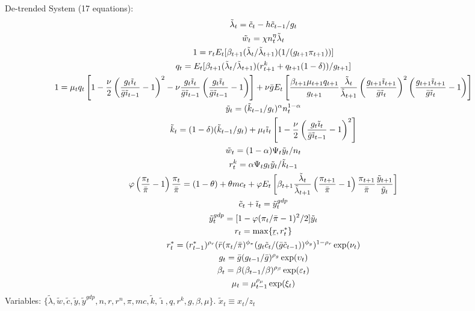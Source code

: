 \documentclass[12pt, final]{article}
\newcommand{\ubar}[1]{\underaccent{\bar}{#1}}
\begin{document}
\noindent De-trended System (17 equations):
\scriptsize\begin{gather}
  \tilde{\lambda}_t = \tilde{c}_t-h\tilde{c}_{t-1}/g_t\\
  \tilde{w}_t=\chi n_t^\eta\tilde{\lambda}_t \\
  1= r_tE_t[\beta_{t+1}(\tilde{\lambda}_t/\tilde{\lambda}_{t+1})(1/(g_{t+1}\pi_{t+1}))]\\
  q_t = E_t[\beta_{t+1}(\tilde{\lambda}_t/\tilde{\lambda}_{t+1})(r_{t+1}^k+q_{t+1}(1-\delta))/g_{t+1}]\\
  1 = \mu_tq_t\left[1-\frac{\nu}{2}\left(\frac{g_t\tilde{\imath}_t}{\bar{g}\tilde{\imath}_{t-1}}-1\right)^2-\nu\frac{g_t\tilde{\imath}_t}{\bar{g}\tilde{\imath}_{t-1}} \left(\frac{g_t\tilde{\imath}_t}{\bar{g}\tilde{\imath}_{t-1}}-1\right)\right]+\nu\bar{g}
  E_t\left[\frac{\beta_{t+1}\mu_{t+1}q_{t+1}}{g_{t+1}}\frac{\tilde{\lambda}_t}{\tilde{\lambda}_{t+1}}\left(\frac{g_{t+1}\tilde{\imath}_{t+1}}{\bar{g}\tilde{\imath}_t}\right)^2\left(\frac{g_{t+1}\tilde{\imath}_{t+1}}{\bar{g}\tilde{\imath}_t}-1\right)\right]\\
  \tilde{y}_t=(\tilde{k}_{t-1}/g_t)^\alpha n_t^{1-\alpha}\\
  \tilde{k}_t=(1-\delta)(\tilde{k}_{t-1}/g_t)+\mu_t\tilde{\imath}_t\left[1-\frac{\nu}{2}\left(\frac{g_t\tilde{\imath}_t}{\bar{g}\tilde{\imath}_{t-1}}-1\right)^2\right]\\
  \tilde{w}_t = (1-\alpha)\Psi_t\tilde{y}_t/n_t\\
  r_t^k = \alpha\Psi_tg_t\tilde{y}_t/\tilde{k}_{t-1}\\  
  \varphi\left(\frac{\pi_t}{\bar{\pi}}-1\right)\frac{\pi_t}{\bar{\pi}} = (1-\theta) + \theta mc_t + \varphi E_t\left[\beta_{t+1}\frac{\tilde{\lambda}_t}{\tilde{\lambda}_{t+1}}\left(\frac{\pi_{t+1}}{\bar{\pi}}-1\right)\frac{\pi_{t+1}}{\bar{\pi}}\frac{\tilde{y}_{t+1}}{\tilde{y}_t}\right]\\ \tilde{c}_t+\tilde{\imath}_t=\tilde{y}_t^{gdp}\\  
  \tilde{y}_t^{gdp}=[1-\varphi(\pi_t/\bar{\pi}-1)^2/2]\tilde{y}_t\\
   r_t=\max\{\ubar{r},r_t^*\}\\
   r_t^*=(r_{t-1}^*)^{\rho_r}(\bar{r}(\pi_t/\bar{\pi})^{\phi_\pi}(g_t\tilde{c}_t/(\bar{g}\tilde{c}_{t-1}))^{\phi_y})^{1-\rho_r}\exp(\nu_t)\\
  g_t=\bar{g}(g_{t-1}/\bar{g})^{\rho_g}\exp(\upsilon_t)\\
  \beta_t=\beta(\beta_{t-1}/\beta)^{\rho_\beta}\exp(\varepsilon_t)\\
  \mu_t=\mu_{t-1}^{\rho_\mu}\exp(\xi_t)
\end{gather}\normalsize
Variables: $\{\tilde{\lambda},\tilde{w},\tilde{c},\tilde{y},\tilde{y}^{gdp},n,r,r^n,\pi,mc,\tilde{k},\tilde{\imath},q,r^k,g,\beta,\mu\}$. $\tilde{x}_t\equiv x_t/z_t$
\end{document}
